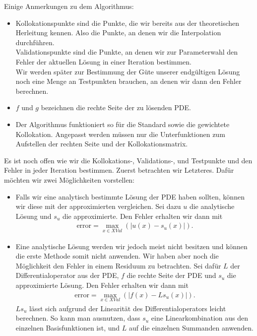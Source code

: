 Einige Anmerkungen zu dem Algorithmus:
\begin{itemize}
\item
Kollokationspunkte sind die Punkte, die wir bereits aus der theoretischen Herleitung kennen. Also die Punkte, an denen wir die Interpolation durchführen.\\
Validationspunkte sind die Punkte, an denen wir zur Parameterwahl den Fehler der aktuellen Lösung in einer Iteration bestimmen.\\
Wir werden später zur Bestimmung der Güte unserer endgültigen Lösung noch eine Menge an Testpunkten brauchen, an denen wir dann den Fehler berechnen.
\item
$f$ und $g$ bezeichnen die rechte Seite der zu lösenden \gls{PDE}.
\item
Der Algorithmus funktioniert so für die Standard sowie die gewichtete Kollokation. Angepasst werden müssen nur die Unterfunktionen zum Aufstellen der rechten Seite und der Kollokationsmatrix.
\end{itemize}
Es ist noch offen wie wir die Kollokations-, Validations-, und Testpunkte und den Fehler in jeder Iteration bestimmen. Zuerst betrachten wir Letzteres. Dafür möchten wir zwei Möglichkeiten vorstellen:
\begin{itemize}
\item
Falls wir eine analytisch bestimmte Lösung der \gls{PDE} haben sollten, können wir diese mit der approximierten vergleichen. Sei dazu $u$ die analytische Lösung und $s_u$ die approximierte. Den Fehler erhalten wir dann mit
\begin{align*}
\mathrm{error} = \max_{x \in XVal} \left(\left| u(x) - s_u(x) \right| \right).
\end{align*}
\item
Eine analytische Lösung werden wir jedoch meist nicht besitzen und können die erste Methode somit nicht anwenden. Wir haben aber noch die Möglichkeit den Fehler in einem Residuum zu betrachten. Sei dafür $L$ der Differentialoperator aus der \gls{PDE}, $f$ die rechte Seite der \gls{PDE} und $s_u$ die approximierte Lösung. Den Fehler erhalten wir dann mit
\begin{align*}
\mathrm{error} = \max_{x \in XVal} \left(\left| f(x) - L s_u(x) \right| \right).
\end{align*}
$Ls_u$ lässt sich aufgrund der Linearität des Differentialoperators leicht berechnen. So kann man ausnutzen, dass $s_u$ eine Linearkombination aus den einzelnen Basisfunktionen ist, und $L$ auf die einzelnen Summanden anwenden.
\end{itemize}

